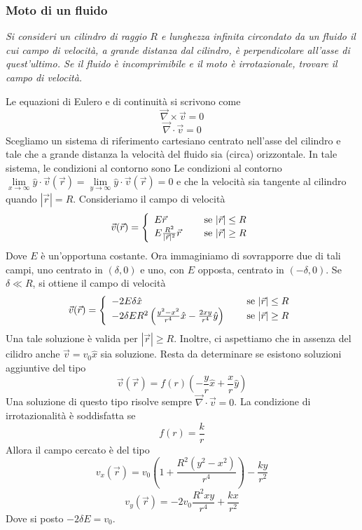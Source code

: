 \documentclass[a4paper,11pt]{article}
\begin{document}
\subsubsection{Moto di un fluido}
\textit{Si consideri un cilindro di raggio $R$ e lunghezza infinita circondato da un fluido il cui campo di velocità, a grande distanza dal cilindro, è perpendicolare all'asse di quest'ultimo. Se il fluido è incomprimibile e il moto è irrotazionale, trovare il campo di velocità.}
\vspace{5mm}

\noindent Le equazioni di Eulero e di continuità si scrivono come
\[\vec{\nabla}\times\vec{v}=0\]
\[\vec{\nabla}\cdot\vec{v}=0\]
Scegliamo un sistema di riferimento cartesiano centrato nell'asse del cilindro e tale che a grande distanza la velocità del fluido sia (circa) orizzontale. In tale sistema, le condizioni al contorno sono
Le condizioni al contorno $\lim\limits_{x\to\infty}\hat{y}\cdot\vec{v}(\vec{r})=\lim\limits_{y\to\infty}\hat{y}\cdot\vec{v}(\vec{r})=0$ 
e che la velocità sia tangente al cilindro quando $|\vec{r}|=R$. Consideriamo il campo di velocità
\[\vec{v}(\vec{r})=\left\{\begin{array}{l l r}
E\vec{r}&&\textrm{ se $|\vec{r}|\leq R$}\\
E\frac{R^2}{|\vec{r}|^2}\vec{r}&&\textrm{se $|\vec{r}|\geq R$}
\end{array}\right.\]
Dove $E$ è un'opportuna costante. Ora immaginiamo di sovrapporre due di tali campi, uno centrato in $(\delta,0)$ e uno, con $E$ opposta, centrato in $(-\delta,0)$. Se $\delta\ll R$, si ottiene il campo di velocità
\[\vec{v}(\vec{r})=\left\{\begin{array}{l l r}
-2E\delta\hat{x}&&\textrm{ se $|\vec{r}|\leq R$}\\
-2\delta ER^2\left(\frac{y^2-x^2}{r^4}\hat{x}-\frac{2xy}{r^4}\hat{y}\right)&&\textrm{se $|\vec{r}|\geq R$}
\end{array}\right.\]
Una tale soluzione è valida per $|\vec{r}|\geq R$. Inoltre, ci aspettiamo che in assenza del cilidro anche $\vec{v}=v_0\hat{x}$ sia soluzione. Resta da determinare se esistono soluzioni aggiuntive del tipo
\[\vec{v}(\vec{r})=f(r)\left(-\frac{y}{r}\hat{x}+\frac{x}{r}\hat{y}\right)\]
Una soluzione di questo tipo risolve sempre $\vec{\nabla}\cdot\vec{v}=0$. La condizione di irrotazionalità è
soddisfatta se 
\[f(r)=\frac{k}{r}\]
Allora il campo cercato è del tipo
\[v_x(\vec{r})=v_0\left(1+\frac{R^2(y^2-x^2)}{r^4}\right)-\frac{ky}{r^2}\]
\[v_y(\vec{r})=-2v_0\frac{R^2xy}{r^4}+\frac{kx}{r^2}\]
Dove si posto $-2\delta E=v_0$.
\end{document}
